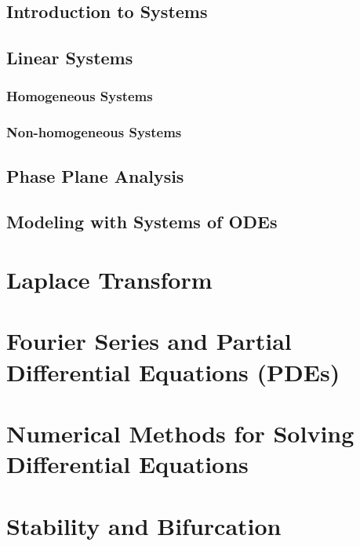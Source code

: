 \documentclass[11pt]{article}
\begin{document}
		\subsection{Introduction to Systems}
			\lipsum[1]
		\subsection{Linear Systems}
			\lipsum[1]
			\subsubsection{Homogeneous Systems}
				\lipsum[1]
			\subsubsection{Non-homogeneous Systems}
				\lipsum[1]
		\subsection{Phase Plane Analysis}
			\lipsum[1]
		\subsection{Modeling with Systems of ODEs}
			\lipsum[1]
	\section{Laplace Transform}
		\lipsum[1]
	\section{Fourier Series and Partial Differential Equations (PDEs)}
		\lipsum[1]
	\section{Numerical Methods for Solving Differential Equations}
		\lipsum[1]
	\section{Stability and Bifurcation}
		\lipsum[1]
\end{document}
